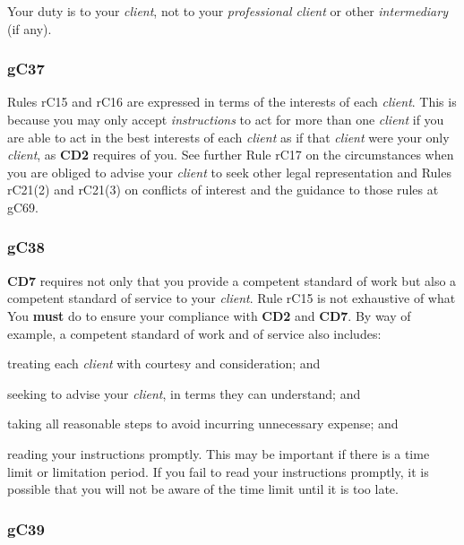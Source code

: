 Your duty is to your \emph{client}, not to your \emph{professional
client} or other \emph{intermediary} (if any).

\subsubsection{\color{darkgrey}gC37}

Rules rC15 and rC16 are expressed in terms of the interests of each
\emph{client}. This is because you may only accept \emph{instructions}
to act for more than one \emph{client} if you are able to act in the
best interests of each \emph{client} as if that \emph{client} were your
only \emph{client}, as \textbf{\textcolor{mygold}{CD2}} requires of you. See further Rule rC17 on the
circumstances when you are obliged to advise your \emph{client} to seek
other legal representation and Rules rC21(2) and rC21(3) on conflicts of
interest and the guidance to those rules at gC69.

\subsubsection{\color{darkgrey}gC38}

 \textbf{\textcolor{mygold}{CD7}} requires not only that you provide a competent standard of work but
also a competent standard of service to your \emph{client}. Rule rC15 is
not exhaustive of what You \textcolor{myred}{\textbf{must}} do to ensure your compliance with \textbf{\textcolor{mygold}{CD2}}
and  \textbf{\textcolor{mygold}{CD7}}. By way of example, a competent standard of work and of service
also includes:
\begin{numlist}\item treating each \emph{client} with courtesy and consideration; and
\item seeking to advise your \emph{client}, in terms they can understand;
and
\item taking all reasonable steps to avoid incurring unnecessary expense;
and
\item reading your instructions promptly. This may be important if there is
a time limit or limitation period. If you fail to read your instructions
promptly, it is possible that you will not be aware of the time limit
until it is too late.
\end{numlist}

\subsubsection{\color{darkgrey}gC39}

